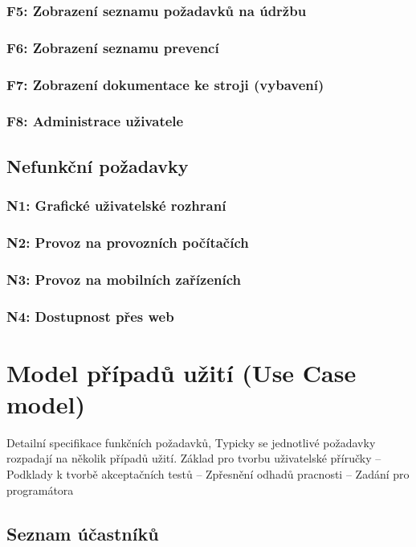 \documentclass[thesis=M,czech]{FITthesis}[2012/06/26]
\begin{document}
\subsubsection{F5: Zobrazení seznamu požadavků na údržbu}
\subsubsection{F6: Zobrazení seznamu prevencí}
\subsubsection{F7: Zobrazení dokumentace ke stroji (vybavení)}
\subsubsection{F8: Administrace uživatele}


\subsection{Nefunkční požadavky}

\subsubsection{N1: Grafické uživatelské rozhraní}
\subsubsection{N2: Provoz na provozních počítačích}
\subsubsection{N3: Provoz na mobilních zařízeních}
\subsubsection{N4: Dostupnost přes web}

\section{Model případů užití (Use Case model)}
Detailní specifikace funkčních požadavků, Typicky se jednotlivé požadavky rozpadají na několik případů užití. Základ pro tvorbu uživatelské příručky
– Podklady k tvorbě akceptačních testů
– Zpřesnění odhadů pracnosti
– Zadání pro programátora


\subsection{Seznam účastníků}
\end{document}
